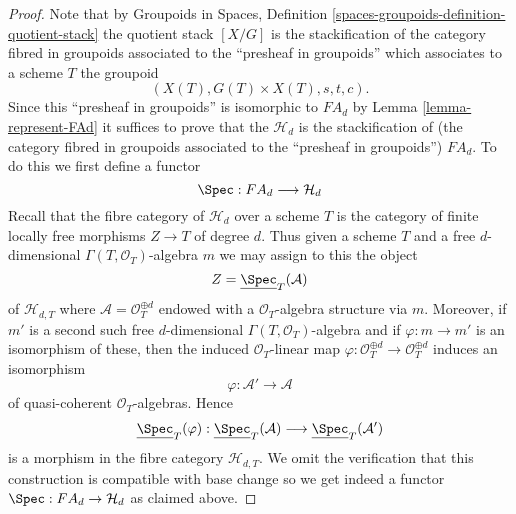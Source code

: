 \begin{proof}
Note that by
Groupoids in Spaces, Definition
\ref{spaces-groupoids-definition-quotient-stack}
the quotient stack $[X/G]$ is the stackification of the
category fibred in groupoids associated to the ``presheaf in groupoids''
which associates to a scheme $T$ the groupoid
$$
(X(T), G(T) \times X(T), s, t, c).
$$
Since this ``presheaf in groupoids'' is isomorphic to $FA_d$ by
Lemma \ref{lemma-represent-FAd}
it suffices to prove that the $\mathcal{H}_d$ is the stackification
of (the category fibred in groupoids associated to the
``presheaf in groupoids'') $FA_d$. To do this we first define a
functor
$$
\Spec : FA_d \longrightarrow \mathcal{H}_d
$$
Recall that the fibre category of $\mathcal{H}_d$ over a scheme $T$
is the category of finite locally free morphisms $Z \to T$ of degree $d$.
Thus given a scheme $T$ and a free $d$-dimensional
$\Gamma(T, \mathcal{O}_T)$-algebra $m$ we may assign to this the object
$$
Z = \underline{\Spec}_T(\mathcal{A})
$$
of $\mathcal{H}_{d, T}$
where $\mathcal{A} = \mathcal{O}_T^{\oplus d}$ endowed with a
$\mathcal{O}_T$-algebra structure via $m$. Moreover, if $m'$ is
a second such free $d$-dimensional $\Gamma(T, \mathcal{O}_T)$-algebra
and if $\varphi : m \to m'$ is an isomorphism of these, then
the induced $\mathcal{O}_T$-linear map
$\varphi : \mathcal{O}_T^{\oplus d} \to \mathcal{O}_T^{\oplus d}$
induces an isomorphism
$$
\varphi : \mathcal{A}' \longrightarrow \mathcal{A}
$$
of quasi-coherent $\mathcal{O}_T$-algebras. Hence
$$
\underline{\Spec}_T(\varphi) :
\underline{\Spec}_T(\mathcal{A})
\longrightarrow
\underline{\Spec}_T(\mathcal{A}')
$$
is a morphism in the fibre category $\mathcal{H}_{d, T}$. We omit the
verification that this construction is compatible with base change so
we get indeed a functor $\Spec : FA_d \to \mathcal{H}_d$
as claimed above.


\end{proof}
